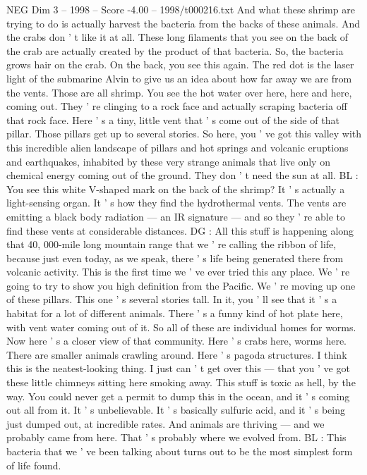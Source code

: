 \begin{textsample}{NEG Dim 3 – 1998 – Score -4.00 – 1998/t000216.txt}
And what these shrimp are trying to do is actually harvest the bacteria from the backs of these animals.
And the crabs don ' t like it at all.
These long filaments that you see on the back of the crab are actually created by the product of that bacteria.
So, the bacteria grows hair on the crab.
On the back, you see this again.
The red dot is the laser light of the submarine Alvin to give us an idea about how far away we are from the vents.
Those are all shrimp.
You see the hot water over here, here and here, coming out.
They ' re clinging to a rock face and actually scraping bacteria off that rock face.
Here ' s a tiny, little vent that ' s come out of the side of that pillar.
Those pillars get up to several stories.
So here, you ' ve got this valley with this incredible alien landscape of pillars and hot springs and volcanic eruptions and earthquakes, inhabited by these very strange animals that live only on chemical energy coming out of the ground.
They don ' t need the sun at all.
BL : You see this white V-shaped mark on the back of the shrimp?
It ' s actually a light-sensing organ.
It ' s how they find the hydrothermal vents.
The vents are emitting a black body radiation — an IR signature — and so they ' re able to find these vents at considerable distances.
DG : All this stuff is happening along that 40, 000-mile long mountain range that we ' re calling the ribbon of life, because just even today, as we speak, there ' s life being generated there from volcanic activity.
This is the first time we ' ve ever tried this any place.
We ' re going to try to show you high definition from the Pacific.
We ' re moving up one of these pillars.
This one ' s several stories tall.
In it, you ' ll see that it ' s a habitat for a lot of different animals.
There ' s a funny kind of hot plate here, with vent water coming out of it.
So all of these are individual homes for worms.
Now here ' s a closer view of that community.
Here ' s crabs here, worms here.
There are smaller animals crawling around.
Here ' s pagoda structures.
I think this is the neatest-looking thing.
I just can ' t get over this — that you ' ve got these little chimneys sitting here smoking away.
This stuff is toxic as hell, by the way.
You could never get a permit to dump this in the ocean, and it ' s coming out all from it.
It ' s unbelievable.
It ' s basically sulfuric acid, and it ' s being just dumped out, at incredible rates.
And animals are thriving — and we probably came from here.
That ' s probably where we evolved from.
BL : This bacteria that we ' ve been talking about turns out to be the most simplest form of life found.

\end{textsample}
